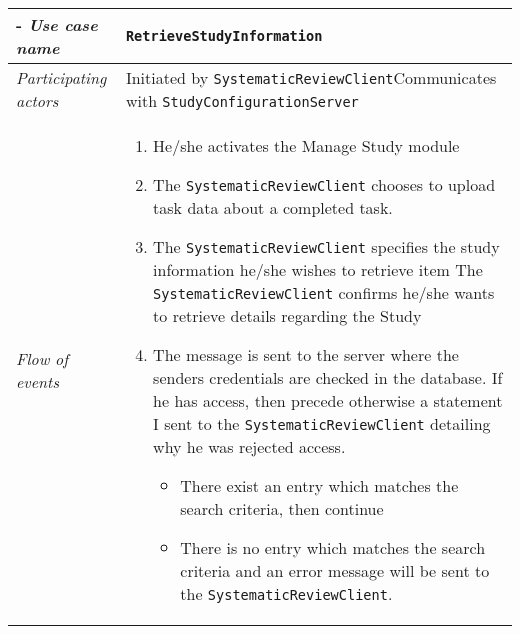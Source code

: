 
%
%
\newcommand{\client}{\texttt{SystematicReviewClient}\xspace}
\newcommand{\server}{\texttt{StudyConfigurationServer}\xspace}
\newcommand{\studyconfigui}{\texttt{StudyConfigurationUI}\xspace}
\newcommand{\teammanagement}{\texttt{Team Management}\xspace}
\newcommand{\researcher}{\texttt{Researcher}\xspace}
\newcommand{\database}{\texttt{Database}\xspace}
\newcommand{\incident}{\texttt{Incident}\xspace}
\newcommand{\RetrieveStudyInformation}{\texttt{RetrieveStudyInformation}\xspace}
\newcommand{\validateuser}{\texttt{ValidateUser}\xspace}


%
%
\begin{table}[h!]
\tabulinesep=1.5mm
\begin{tabu} to 
	\tabucline[1.5pt]-
	\textit{Use case name} & \RetrieveStudyInformation \\
	\hline
	\textit{Participating actors} & Initiated by \client \newline Communicates with \server \\
	\hline
	\textit{Flow of events} &
	\vspace{-3mm}
	\begin{enumerate}[leftmargin=*,topsep=0pt,itemsep=-1ex]
		\item He/she activates the Manage Study module
		\item The \client chooses to upload task data about a completed task.
		\item The \client specifies the study information he/she wishes to retrieve
		item The \client confirms he/she wants to retrieve details regarding the Study
		\item The message is sent to the server where the senders credentials are checked in the database. If he has access, then precede otherwise a statement I sent to the \client detailing why he was rejected access.
		\begin{itemize} 
			\item There exist an entry which matches the search criteria, then continue 
			\item There is no entry which matches the search criteria and an error message will be sent to the \client.
		\end{itemize}
				

\end{enumerate}
\end{tabu}
\end{table}
